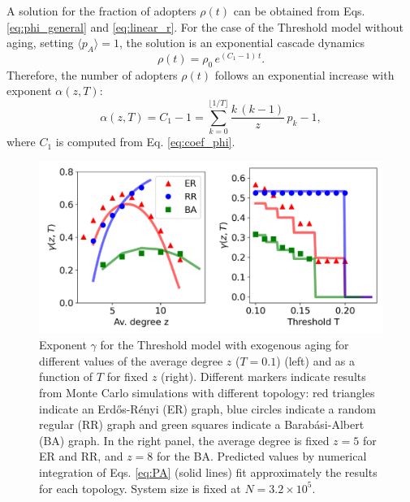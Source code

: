  A solution for the fraction of adopters $\rho(t)$ can be obtained from  Eqs. \eqref{eq:phi_general} and \eqref{eq:linear_r}.  For the case of the Threshold model without aging, setting $\langle p_A \rangle = 1$,  the solution is an exponential cascade dynamics
\begin{equation}
    \rho(t) = \rho_0 \, e^{(C_1 - 1)\, t}.
\end{equation}
Therefore, the number of adopters $\rho (t)$ follows an exponential increase with exponent $\alpha(z,T)$:
\begin{equation}
    \label{eq:alpha}
    \alpha(z,T) = C_1 - 1 = \sum_{k=0}^{\lfloor 1/T \rfloor} \frac{k \, (k - 1)}{z}\, p_k - 1,
\end{equation}
where $C_1$ is computed from Eq. \eqref{eq:coef_phi}. 

\begin{figure}
\includegraphics[width=\columnwidth]{Figs/Aging_Threshold/EXO.pdf}
\caption{\label{fig:exo_exp} Exponent $\gamma$ for the Threshold model with exogenous aging for different values of the average degree $z$ ($T = 0.1$) (left) and as a function of  $T$ for fixed $z$ (right). Different markers indicate results from Monte Carlo simulations with different topology: red triangles indicate an Erd\H{o}s-R\'enyi (ER) graph, blue circles indicate a random regular (RR) graph and green squares indicate a Barab\'asi-Albert (BA) graph. In the right panel, the average degree is fixed $z = 5$ for ER and RR, and $z = 8$ for the BA. Predicted values by numerical integration of Eqs. \eqref{eq:PA} (solid lines) fit approximately the results for each topology. System size is fixed at $N = 3.2 \times 10^5$.}
\end{figure}

